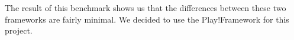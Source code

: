 \begin{center}
	

\end{center}

The result of this benchmark shows us that the differences between these two frameworks are fairly minimal. We decided to use the Play!Framework for this project.
\newpage

